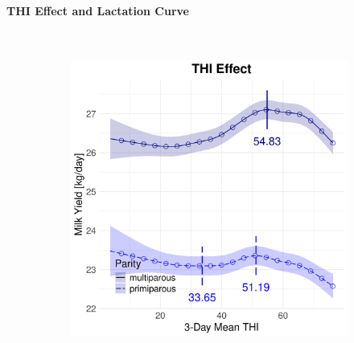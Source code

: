 \newpage
\paragraph{THI Effect and Lactation Curve} \quad \\
\begin{figure}[H]
    \centering
    \begin{subfigure}[b]{0.45\textwidth}
        \centering
        \includegraphics[width=\textwidth]{thesis/figures/models/milk/after2010/ho_milk_after2010/ho_milk_after2010_marginal_thi_milk_combined.png}
    \end{subfigure}
    \hspace{0.05\textwidth} %
    \begin{subfigure}[b]{0.45\textwidth}
        \centering

\end{subfigure}
\end{figure}
